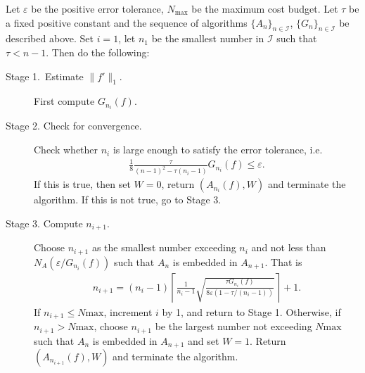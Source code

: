 \begin{algo} \label{algintegration}
 Let $\varepsilon$ be the positive error tolerance, $N_{\text{max}}$ be the maximum cost budget. Let $\tau$ be a fixed positive constant and the sequence of algorithms $\{A_n\}_{n\in \mathcal{I}}$, $\{G_n\}_{n\in \mathcal{I}}$ be described above. Set $i=1$, let $n_1$ be the smallest number in $\mathcal{I}$ such that $\tau < n-1$. Then do the following:
\begin{description}
\item[Stage 1.\ Estimate {$\|f'\|_{1}$}.] First compute $G_{n_i}(f)$.

\item[Stage 2. Check for convergence.] Check whether $n_i$ is large enough to satisfy the error tolerance, i.e.
    \begin{align*}
      \frac{1}{8}\frac{\tau}{(n-1)^2-\tau(n_i-1)}G_{n_i}(f)\leq \varepsilon.
    \end{align*}
    If this is true, then set $W=0$, return $(A_{n_i}(f),W)$ and terminate the algorithm. If this is not true, go to Stage 3.

\item[Stage 3. Compute $n_{i+1}$.] Choose $n_{i+1}$ as the smallest number exceeding $n_i$ and not less than $N_A(\varepsilon/G_{n_i}(f))$ such that $A_n$ is embedded in $A_{n+1}$. That is
    \begin{align*}
      n_{i+1}=(n_i-1)\left\lceil\frac{1}{n_{i}-1}\sqrt{\frac{\tau G_{n_i}(f)}{8\varepsilon(1 - \tau/ (n_i-1))}}\right\rceil+1.
    \end{align*}
    If $n_{i+1}\leq N{\text{max}}$, increment $i$ by 1, and return to Stage 1. Otherwise, if $n_{i+1}> N{\text{max}}$, choose $n_{i+1}$ be the largest number not exceeding $N{\text{max}}$ such that $A_n$ is embedded in $A_{n+1}$ and set $W=1$. Return $(A_{n_{i+1}}(f),W)$ and terminate the algorithm.
\end{description}
\end{algo}


